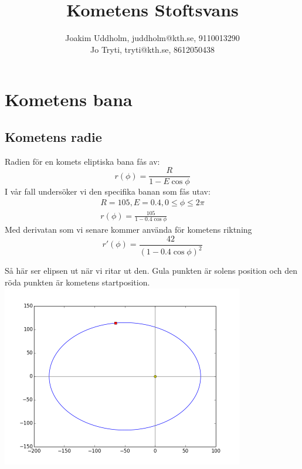 \documentclass[11pt,twoside]{article}
\title{Kometens Stoftsvans}
\author{Joakim Uddholm, juddholm@kth.se, 9110013290 \\
		Jo Tryti, tryti@kth.se, 8612050438}
\date{}
\begin{document}
\maketitle
\newpage


\section{Kometens bana}

\subsection{Kometens radie}
Radien för en komets eliptiska bana fås av:
\begin{equation}
    r(\phi)=\frac{R}{1-E\cos\phi}
\end{equation}
I vår fall undersöker vi den specifika banan som fås utav:
\begin{equation}
	\begin{split}
     R = 105, E = 0.4, 0 \leq \phi \leq 2\pi \\
     r(\phi)=\frac{105}{1-0.4\cos\phi}
     \end{split}
\end{equation}
Med derivatan som vi senare kommer använda för kometens riktning
\begin{equation}
    r'(\phi)=\frac{42}{(1-0.4\cos\phi)^2}
\end{equation}

Så här ser elipsen ut när vi ritar ut den. Gula punkten är solens position och den röda punkten är kometens startposition.\\
\includegraphics[width=300pt]{imgs/elipse.png}
\end{document}

